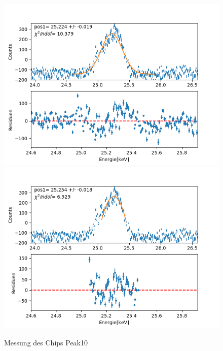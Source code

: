 \documentclass[12pt,a4paper]{article}
\begin{document}
\begin{figure}[H]
\centering
\includegraphics[scale=0.49]{Bilder/roentgen_spektren/chip/chip10_1.png}
\includegraphics[scale=0.49]{Bilder/roentgen_spektren/chip/chip10_2.png}
\caption{Messung des Chips Peak10}
\end{figure}
\end{document}
